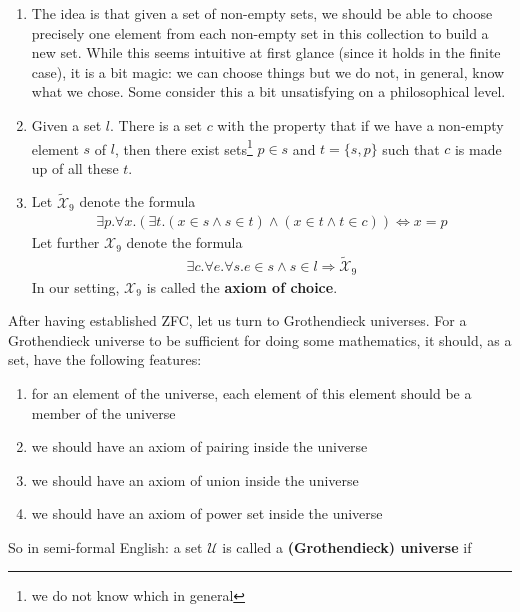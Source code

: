 \begin{enumerate}
\begin{enumerate}
\item[$\bullet$]
The idea is that given a set of non-empty sets, we should be able to choose precisely one element from each non-empty set in this collection to build a new set.
While this seems intuitive at first glance (since it holds in the finite case), it is a bit magic: we can choose things but we do not, in general, know what we chose.
Some consider this a bit unsatisfying on a philosophical level.
\item[$\bullet$]
Given a set $l$.
There is a set $c$ with the property that if we have a non-empty element $s$ of $l$, then there exist sets\footnote{we do not know which in general} $p \in s$ and $t = \lbrace s,p \rbrace$ such that $c$ is made up of all these $t$.
\item[$\bullet$]
Let $\tilde{\mathcal{X}}_{9}$ denote the formula
\begin{align*}
  \exists
  p
  .
  \forall
  x
  .
  \left(
    \exists
    t
    .
    \left(
      x
      \in
      s
      \land
      s
      \in
      t
    \right)
    \land
    \left(
      x
      \in
      t
      \land
      t
      \in
      c
    \right)
  \right)
  \Leftrightarrow
  x
  =
  p
\end{align*}
Let further $\mathcal{X}_{9}$ denote the formula
\begin{align*}
  \exists
  c
  .
  \forall
  e
  .
  \forall
  s
  .
  e
  \in
  s
  \land
  s
  \in
  l
  \Rightarrow
  \tilde{\mathcal{X}}_{9}
\end{align*}
In our setting, $\mathcal{X}_{9}$ is called the \textbf{axiom of choice}.
\end{enumerate}
\end{enumerate}
After having established ZFC, let us turn to Grothendieck universes.
For a Grothendieck universe to be sufficient for doing some mathematics, it should, as a set, have the following features:
\begin{enumerate}
\item[(1)]
for an element of the universe, each element of this element should be a member of the universe
\item[(2)]
we should have an axiom of pairing inside the universe
\item[(3)]
we should have an axiom of union inside the universe
\item[(4)]
we should have an axiom of power set inside the universe
\end{enumerate}
So in semi-formal English: a set $\mathcal{U}$ is called a \textbf{(Grothendieck) universe} if
